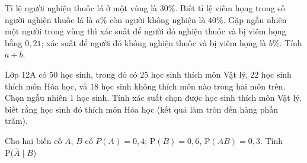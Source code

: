 \begin{bt}%
	Tỉ lệ người nghiện thuốc lá ở một vùng là  $30\%$. Biết tỉ lệ viêm họng trong số người nghiện thuốc lá là $a\%$ còn người không nghiện là $40\%$. Gặp ngẫu nhiên một người trong vùng thì xác suất để người đó nghiện thuốc và bị viêm họng bằng $0{,}21$; xác suất để người đó không nghiện thuốc và bị viêm họng là $b\%$. Tính $a+b$.
\end{bt}

\begin{bt}%
	Lớp 12A có $50$ học sinh, trong đó có $25$ học sinh thích môn Vật lý, $22$ học sinh thích môn Hóa học, và $18$ học sinh không thích môn  nào trong hai môn trên. Chọn ngẫu nhiên $1$ học sinh. Tính xác suất chọn được học sinh thích môn Vật lý, biết rằng học sinh đó thích môn Hóa học (kết quả làm tròn đến hàng phần trăm).
\end{bt}

\begin{bt}%
	Cho hai biến cố $A$, $B$  có $P(A)=0{,}4$; $\mathrm{P}(B)=0{,}6$, $\mathrm{P}(AB)=0{,}3$. Tính $\mathrm{P}\big(\overline{A} \mid B\big)$
\end{bt}


